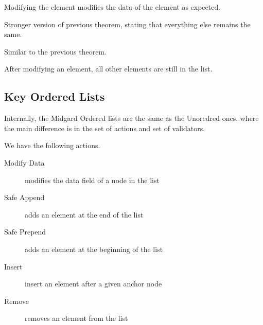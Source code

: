 \begin{theorem}
  \label{thm:MUList.Properties.ModifyData_modified}
  \leanok
  Modifying the element modifies the data of the element as expected.
  \end{theorem} 

\begin{theorem}
  \label{thm:MUList.Properties.ModifyData_modified_stronger}
  \leanok
  Stronger version of previous theorem, stating that everything else remains the same.
  \end{theorem} 
\begin{theorem}
  \label{thm:MUList.Properties.ModifyData_modified_stronger'}
  \leanok
  Similar to the previous theorem.
  \end{theorem} 

\begin{theorem}
  \label{thm:MUList.Properties.ModifyData_same_members}
  \leanok
  After modifying an element, all other elements are still in the list.
  \end{theorem} 

\subsection{Key Ordered Lists }

Internally, the Midgard Ordered lists are the same as the Unoredred ones, where
the main difference is in the set of actions and set of validators.


\begin{definition}[Actions]
  \label{dfn:MOList.State.Actions}
  \leanok
  We have the following actions.
  \begin{description}
    \item[Modify Data] modifies the data field of a node in the list
    \item[Safe Append] adds an element at the end of the list
    \item[Safe Prepend] adds an element at the beginning of the list
    \item[Insert] insert an element after a given anchor node
    \item[Remove] removes an element from the list
    \end{description}
  \end{definition}

